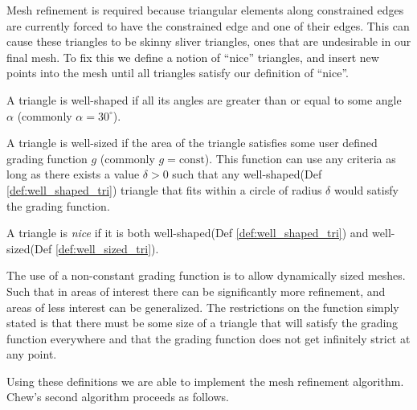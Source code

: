 \documentclass[../fem.tex]{subfiles}
\begin{document}
Mesh refinement is required because triangular elements along constrained
edges are currently forced to have the constrained edge and one of their edges.
This can cause these triangles to be skinny sliver triangles, ones that are
undesirable in our final mesh. To fix this we define a notion of ``nice''
triangles, and insert new points into the mesh until all triangles satisfy
our definition of ``nice''.

\begin{definition}\label{def:well_shaped_tri}
  A triangle is well-shaped if all its angles are greater than or equal to some
  angle $\alpha$ (commonly $\alpha=30^{\circ}$).
\end{definition}

\begin{definition}\label{def:well_sized_tri}
  A triangle is well-sized if the area of the triangle satisfies some user
  defined grading function $g$ (commonly $g=\text{const}$). This function can
  use any criteria as long as there exists a value $\delta > 0$ such that any
  well-shaped(Def \ref{def:well_shaped_tri}) triangle that fits within a circle
  of radius $\delta$ would satisfy the grading function.
\end{definition}

\begin{definition} \label{def:nice_tri}
  A triangle is \textit{nice} if it is both well-shaped(Def
  \ref{def:well_shaped_tri}) and well-sized(Def \ref{def:well_sized_tri}).
\end{definition}

The use of a non-constant grading function is to allow dynamically sized
meshes.  Such that in areas of interest there can be significantly more
refinement, and areas of less interest can be generalized. The restrictions on
the function simply stated is that there must be some size of a triangle that
will satisfy the grading function everywhere and that the grading function
does not get infinitely strict at any point.

Using these definitions we are able to implement the mesh refinement algorithm.
Chew's second algorithm proceeds as follows.
\end{document}
